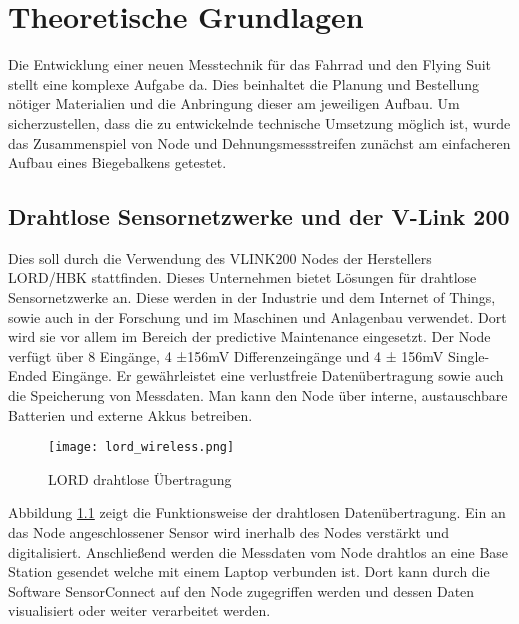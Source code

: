 \chapter{Theoretische Grundlagen}
Die Entwicklung einer neuen Messtechnik für das Fahrrad und den Flying Suit stellt eine komplexe Aufgabe da.
Dies beinhaltet die Planung und Bestellung nötiger Materialien und die Anbringung dieser am jeweiligen Aufbau.
Um sicherzustellen, dass die zu entwickelnde technische Umsetzung möglich ist, wurde das Zusammenspiel von Node und Dehnungsmessstreifen zunächst am einfacheren Aufbau eines Biegebalkens getestet.



\section{Drahtlose Sensornetzwerke und der V-Link 200}

Dies soll durch die Verwendung des VLINK200 Nodes der Herstellers LORD/HBK stattfinden.
Dieses Unternehmen bietet Lösungen für drahtlose Sensornetzwerke an. Diese werden in der Industrie und dem Internet of Things, sowie auch in der Forschung und im Maschinen und Anlagenbau verwendet.
Dort wird sie vor allem im Bereich der predictive Maintenance eingesetzt.
Der Node verfügt über 8 Eingänge, 4 ±156mV Differenzeingänge und 4 ± 156mV Single-Ended Eingänge.
Er gewährleistet eine verlustfreie Datenübertragung sowie auch die Speicherung von Messdaten.
Man kann den Node über interne, austauschbare Batterien und externe Akkus betreiben.

\begin{figure}[h]
    \begin{center}
        \texttt{[image: lord\_wireless.png]}
        \caption[LORD drahtlose Übertragung (Abbildungsverzeichnis)]{LORD drahtlose Übertragung
        \cite{VLInkManual}
        }
        \label{fig:lordwireless}
    \end{center}
\end{figure}

Abbildung \ref{fig:lordwireless} zeigt die Funktionsweise der drahtlosen Datenübertragung.
Ein an das Node angeschlossener Sensor wird inerhalb des Nodes verstärkt und digitalisiert.
Anschließend werden die Messdaten vom Node drahtlos an eine Base Station gesendet welche mit einem Laptop verbunden ist.
Dort kann durch die Software SensorConnect auf den Node zugegriffen werden und dessen Daten visualisiert oder weiter verarbeitet werden.



